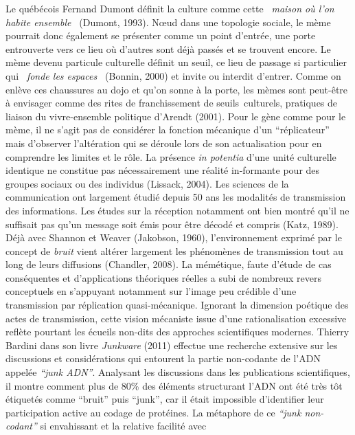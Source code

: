 Le qu\'eb\'ecois Fernand Dumont d\'efinit la culture comme cette \textit{{\guillemotleft}~maison o\`u l{\textquoteright}on habite ensemble~{\guillemotright} }(Dumont, 1993). N{\oe}ud dans une topologie sociale, le m\`eme pourrait donc \'egalement se pr\'esenter comme un point d{\textquoteright}entr\'ee, une porte entrouverte vers ce lieu o\`u d{\textquoteright}autres sont d\'ej\`a pass\'es et se trouvent encore. Le m\`eme devenu particule culturelle d\'efinit un seuil, ce lieu de passage si particulier qui \textit{{\guillemotleft}~fonde les espaces~{\guillemotright}} (Bonnin, 2000) et invite ou interdit d{\textquoteright}entrer. Comme on enl\`eve ces chaussures au dojo et qu{\textquoteright}on sonne \`a la porte, les m\`emes sont peut-\^etre \`a envisager comme des rites de franchissement de seuils~culturels, pratiques de liaison du vivre-ensemble politique d{\textquoteright}Arendt (2001). Pour le g\`ene comme pour le m\`eme, il ne s{\textquoteright}agit pas de consid\'erer la fonction m\'ecanique d{\textquoteright}un {\textquotedblleft}r\'eplicateur{\textquotedblright} mais d{\textquoteright}observer l{\textquoteright}alt\'eration qui se d\'eroule lors de son actualisation pour en comprendre les limites et le r\^ole. La pr\'esence \textit{in potentia }d{\textquoteright}une unit\'e culturelle identique ne constitue pas n\'ecessairement une r\'ealit\'e in-formante pour des groupes sociaux ou des individus (Lissack, 2004). Les sciences de la communication ont largement \'etudi\'e depuis 50 ans les modalit\'es de transmission des informations. Les \'etudes sur la r\'eception notamment ont bien montr\'e qu{\textquoteright}il ne suffisait pas qu{\textquoteright}un message soit \'emis pour \^etre d\'ecod\'e et compris (Katz, 1989). D\'ej\`a avec Shannon et Weaver (Jakobson, 1960), l{\textquoteright}environnement exprim\'e par le concept de\textit{ bruit }vient alt\'erer largement les ph\'enom\`enes de transmission tout au long de leurs diffusions (Chandler, 2008). La m\'em\'etique, faute d{\textquoteright}\'etude de cas cons\'equentes et d{\textquoteright}applications th\'eoriques r\'eelles \cite{Jouxtel2014} a subi de nombreux revers conceptuels en s{\textquoteright}appuyant notamment sur l{\textquoteright}image peu cr\'edible d{\textquoteright}une transmission par r\'eplication quasi-m\'ecanique. Ignorant la dimension po\'etique des actes de transmission, cette vision m\'ecaniste issue d{\textquoteright}une rationalisation excessive refl\`ete pourtant les \'ecueils non-dits des approches scientifiques modernes. Thierry Bardini dans son livre \textit{Junkware }(2011) effectue une recherche extensive sur les discussions et consid\'erations qui entourent la partie non-codante de l{\textquoteright}ADN appel\'ee \textit{{\textquotedblleft}junk ADN{\textquotedblright}}. Analysant les discussions dans les publications scientifiques, il montre comment plus de 80\% des \'el\'ements structurant l{\textquoteright}ADN ont \'et\'e tr\`es t\^ot \'etiquet\'es comme {\textquotedblleft}bruit{\textquotedblright} puis {\textquotedblleft}junk{\textquotedblright}, car il \'etait impossible d{\textquoteright}identifier leur participation active au codage de prot\'eines. La m\'etaphore de ce \textit{{\textquotedblleft}junk non-codant{\textquotedblright} }si envahissant et la relative facilit\'e avec 